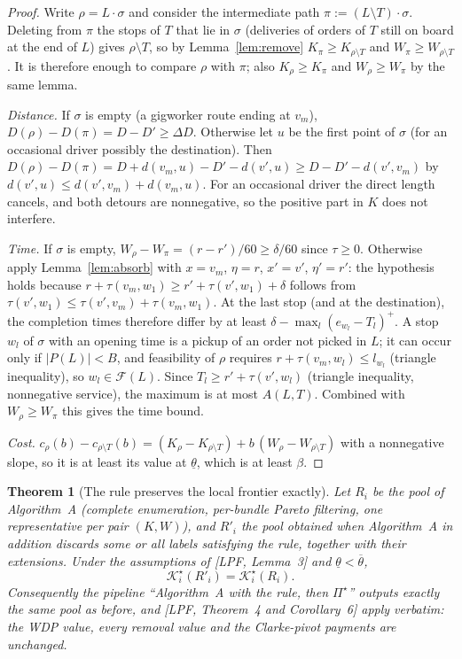 \documentclass[11pt]{article}
\newtheorem{theorem}{Theorem}
\theoremstyle{definition}
\theoremstyle{remark}
\newcommand{\Ks}{\mathcal{K}^{\star}}
\newcommand{\thl}{\underline{\theta}}
\newcommand{\thu}{\overline{\theta}}
\newcommand{\0}{\mathbf{0}}
\begin{document}
\begin{proof}
Write $\rho=L\cdot\sigma$ and consider the intermediate path $\pi:=(L\setminus T)\cdot\sigma$.
Deleting from $\pi$ the stops of $T$ that lie in $\sigma$ (deliveries of orders of $T$ still on
board at the end of $L$) gives $\rho\setminus T$, so by Lemma~\ref{lem:remove}
$K_\pi\ge K_{\rho\setminus T}$ and $W_\pi\ge W_{\rho\setminus T}$. It is therefore enough to
compare $\rho$ with $\pi$; also $K_\rho\ge K_\pi$ and $W_\rho\ge W_\pi$ by the same lemma.

\emph{Distance.} If $\sigma$ is empty (a gigworker route ending at $v_m$), $D(\rho)-D(\pi)=D-D'\ge\Delta D$.
Otherwise let $u$ be the first point of $\sigma$ (for an occasional driver possibly the
destination). Then $D(\rho)-D(\pi)=D+d(v_m,u)-D'-d(v',u)\ge D-D'-d(v',v_m)$ by
$d(v',u)\le d(v',v_m)+d(v_m,u)$. For an occasional driver the direct length cancels, and both
detours are nonnegative, so the positive part in $K$ does not interfere.

\emph{Time.} If $\sigma$ is empty, $W_\rho-W_\pi=(r-r')/60\ge\delta/60$ since $\tau\ge0$. Otherwise
apply Lemma~\ref{lem:absorb} with $x=v_m$, $\eta=r$, $x'=v'$, $\eta'=r'$: the hypothesis holds
because $r+\tau(v_m,w_1)\ge r'+\tau(v',w_1)+\delta$ follows from
$\tau(v',w_1)\le\tau(v',v_m)+\tau(v_m,w_1)$. At the last stop (and at the destination), the
completion times therefore differ by at least $\delta-\max_l(e_{w_l}-T_l)^+$. A stop $w_l$ of
$\sigma$ with an opening time is a pickup of an order not picked in $L$; it can occur only if
$|P(L)|<B$, and feasibility of $\rho$ requires $r+\tau(v_m,w_l)\le l_{w_l}$ (triangle
inequality), so $w_l\in\mathcal F(L)$. Since $T_l\ge r'+\tau(v',w_l)$ (triangle inequality,
nonnegative service), the maximum is at most $A(L,T)$. Combined with $W_\rho\ge W_\pi$ this
gives the time bound.

\emph{Cost.} $c_\rho(b)-c_{\rho\setminus T}(b)=(K_\rho-K_{\rho\setminus T})+b\,(W_\rho-W_{\rho\setminus T})$
with a nonnegative slope, so it is at least its value at $\thl$, which is at least $\beta$.
\end{proof}

\begin{theorem}[The rule preserves the local frontier exactly]\label{thm:preserve}
Let $R_i$ be the pool of Algorithm~A (complete enumeration, per-bundle Pareto filtering, one
representative per pair $(K,W)$), and $R'_i$ the pool obtained when Algorithm~A in addition
discards some or all labels satisfying the rule, together with their extensions. Under the
assumptions of [LPF, Lemma~3] and $\thl<\thu$,
\[
\Ks_i(R'_i)=\Ks_i(R_i).
\]
Consequently the pipeline ``Algorithm~A with the rule, then $\Pi^\star$'' outputs exactly the
same pool as before, and [LPF, Theorem~4 and Corollary~6] apply verbatim: the WDP value, every
removal value and the Clarke-pivot payments are unchanged.
\end{theorem}
\end{document}
